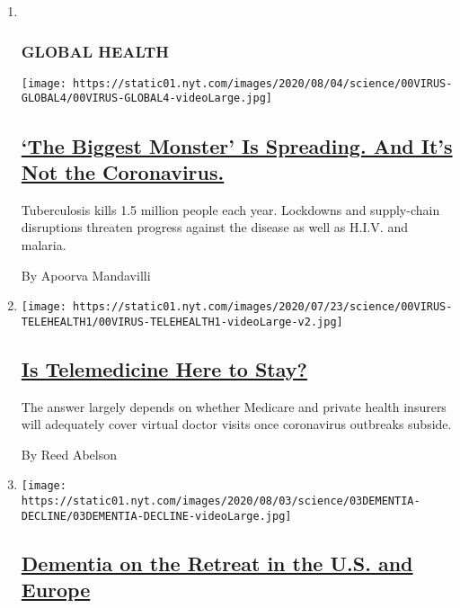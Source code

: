 \begin{enumerate}
\def\labelenumi{\arabic{enumi}.}
\item ~
  \hypertarget{global-health}{%
  \subsubsection{GLOBAL HEALTH}\label{global-health}}

  \texttt{[image: https://static01.nyt.com/images/2020/08/04/science/00VIRUS-GLOBAL4/00VIRUS-GLOBAL4-videoLarge.jpg]}

  \hypertarget{the-biggest-monster-is-spreading-and-its-not-the-coronavirus}{%
  \subsection{\texorpdfstring{\href{/2020/08/03/health/coronavirus-tuberculosis-aids-malaria.html}{`The
  Biggest Monster' Is Spreading. And It's Not the
  Coronavirus.}}{`The Biggest Monster' Is Spreading. And It's Not the Coronavirus.}}\label{the-biggest-monster-is-spreading-and-its-not-the-coronavirus}}

  Tuberculosis kills 1.5 million people each year. Lockdowns and
  supply-chain disruptions threaten progress against the disease as well
  as H.I.V. and malaria.

  By Apoorva Mandavilli
\item
  \texttt{[image: https://static01.nyt.com/images/2020/07/23/science/00VIRUS-TELEHEALTH1/00VIRUS-TELEHEALTH1-videoLarge-v2.jpg]}

  \hypertarget{is-telemedicine-here-to-stay}{%
  \subsection{\texorpdfstring{\href{/2020/08/03/health/covid-telemedicine-congress.html}{Is
  Telemedicine Here to
  Stay?}}{Is Telemedicine Here to Stay?}}\label{is-telemedicine-here-to-stay}}

  The answer largely depends on whether Medicare and private health
  insurers will adequately cover virtual doctor visits once coronavirus
  outbreaks subside.

  By Reed Abelson
\item
  \texttt{[image: https://static01.nyt.com/images/2020/08/03/science/03DEMENTIA-DECLINE/03DEMENTIA-DECLINE-videoLarge.jpg]}

  \hypertarget{dementia-on-the-retreat-in-the-us-and-europe}{%
  \subsection{\texorpdfstring{\href{/2020/08/03/health/alzheimers-dementia-rates.html}{Dementia
  on the Retreat in the U.S. and
  Europe}}{Dementia on the Retreat in the U.S. and Europe}}\label{dementia-on-the-retreat-in-the-us-and-europe}}


\end{enumerate}
